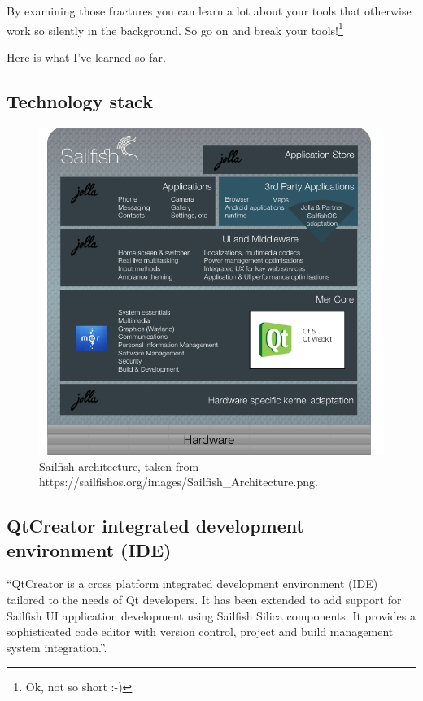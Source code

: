 By examining those fractures you can learn a lot about your tools that otherwise work so silently in the background. So go on and break your tools!\footnote{Ok, not so short :-)}

Here is what I've learned so far.
%
\subsection{Technology stack}
%
\begin{figure}[H]
  \centering
  \includegraphics[scale=0.8]{../media/gfx/Sailfish/Sailfish_Architecture.png} 
  \caption{Sailfish architecture, taken from\\https://sailfishos.org/images/Sailfish\_Architecture.png.}
  \label{fig:SailfishArchitecture}
\end{figure}
%
\subsection{QtCreator integrated development environment (IDE)}\label{subset:QtCreator}
%
``QtCreator is a cross platform integrated development environment (IDE) tailored to the needs of Qt developers. It has been extended to add support for Sailfish UI application development using Sailfish Silica components. It provides a sophisticated code editor with version control, project and build management system integration.''\cite{sailfishos3}.

